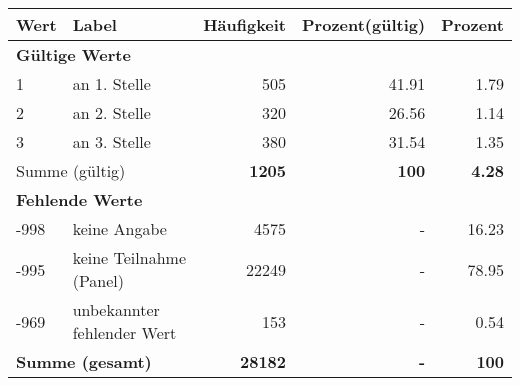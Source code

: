      \begin{longtable}{lXrrr}
     \toprule
     \textbf{Wert} & \textbf{Label} & \textbf{Häufigkeit} & \textbf{Prozent(gültig)} & \textbf{Prozent} \\
     \endhead
     \midrule
     \multicolumn{5}{l}{\textbf{Gültige Werte}}\\

     1 &
     \multicolumn{1}{X}{ an 1. Stelle   } &


       \num{505} &
       \num[round-mode=places,round-precision=2]{41,91} &
         \num[round-mode=places,round-precision=2]{1,79} \\

     2 &
     \multicolumn{1}{X}{ an 2. Stelle   } &


       \num{320} &
       \num[round-mode=places,round-precision=2]{26,56} &
         \num[round-mode=places,round-precision=2]{1,14} \\

     3 &
     \multicolumn{1}{X}{ an 3. Stelle   } &


       \num{380} &
       \num[round-mode=places,round-precision=2]{31,54} &
         \num[round-mode=places,round-precision=2]{1,35} \\
     \midrule
     \multicolumn{2}{l}{Summe (gültig)} &
       \textbf{\num{1205}} &
     \textbf{100} &
       \textbf{\num[round-mode=places,round-precision=2]{4,28}} \\
     \multicolumn{5}{l}{\textbf{Fehlende Werte}}\\
       -998 &
       keine Angabe &
         \num{4575} &
        - &
         \num[round-mode=places,round-precision=2]{16,23} \\
       -995 &
       keine Teilnahme (Panel) &
         \num{22249} &
        - &
         \num[round-mode=places,round-precision=2]{78,95} \\
       -969 &
       unbekannter fehlender Wert &
         \num{153} &
        - &
         \num[round-mode=places,round-precision=2]{0,54} \\
     \midrule
     \multicolumn{2}{l}{\textbf{Summe (gesamt)}} &
          \textbf{\num{28182}} &
        \textbf{-} &
        \textbf{100} \\
     \bottomrule
     \end{longtable}
     
